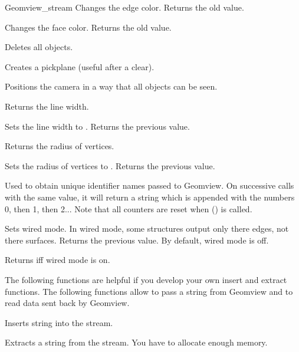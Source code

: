 \begin{ccRefClass}{Geomview_stream}
{Changes the edge color. Returns the old value.}


{Changes the face color. Returns the old value.}



{Deletes all objects.}

{Creates a pickplane (useful after a clear).}

{Positions the camera in a way that all objects can be seen.}

{Returns the line width.}

{Sets the line width to . Returns the previous value.}

{Returns the radius of vertices.}

{Sets the radius of vertices to . Returns the previous value.}

{Used to obtain unique identifier names passed to Geomview.  On successive
calls with the same  value, it will return a string which is 
appended with the numbers 0, then 1, then 2...  Note that all counters are
reset when () is called.}

{Sets wired mode.  In wired mode, some structures output only there edges,
 not there surfaces.
 Returns the previous value. By default, wired mode is off.}

{Returns  iff wired mode is on.}


\newpage
\begin{ccAdvanced}


The following functions are helpful if you develop your own insert
and extract functions. The following functions allow to pass a string
from Geomview and to read data sent back by Geomview.

{Inserts string  into the stream.}


{Extracts a string  from the stream.
\ccPrecond You have to allocate enough memory.}


\end{ccAdvanced}
\end{ccRefClass}
